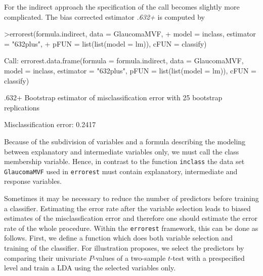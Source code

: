 \documentclass[11pt]{article}
\begin{document}
For the indirect approach the specification of the call becomes 
slightly more complicated. 
The bias corrected estimator {\sl .632+} is computed by 
\begin{Schunk}
\begin{Sinput}
>errorest(formula.indirect, data = GlaucomaMVF, 
+     model = inclass, estimator = "632plus", 
+     pFUN = list(list(model = lm)), cFUN = classify)
\end{Sinput}
\begin{Soutput}
Call:
errorest.data.frame(formula = formula.indirect, data = GlaucomaMVF, 
    model = inclass, estimator = "632plus", pFUN = list(list(model = lm)), 
    cFUN = classify)

	 .632+ Bootstrap estimator of misclassification error 
	 with 25 bootstrap replications

Misclassification error:  0.2417 
\end{Soutput}
\end{Schunk}
Because of the subdivision of variables and a formula describing the 
modeling between explanatory and intermediate variables only, 
we must call the class membership variable. Hence, in contrast to the 
function \texttt{inclass} the data set \texttt{GlaucomaMVF} used in 
\texttt{errorest} must contain explanatory, intermediate and response 
variables. 

Sometimes it may be necessary to reduce the number of predictors before
training a classifier. Estimating the error rate after the variable
selection leads to biased estimates of the misclassfication error and
therefore one should estimate the error rate of the whole procedure. Within
the \texttt{errorest} framework, this can be done as follows. First, we define
a function which does both variable selection and training of the
classifier. For illustration proposes, we select the predictors by comparing
their univariate $P$-values of a two-sample $t$-test with a prespecified
level and train a LDA using the selected variables only.

\begin{Schunk}
\end{Schunk}
\end{document}
